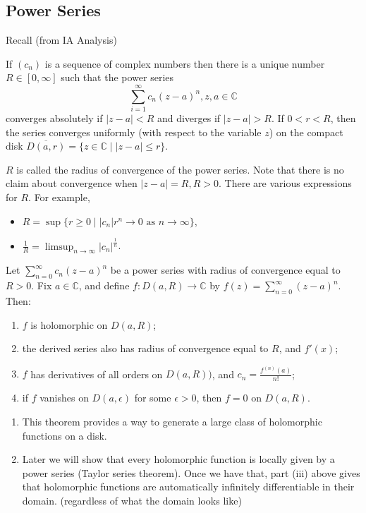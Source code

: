 \subsection{Power Series}
Recall (from IA Analysis)
\begin{theorem}
    If \((c_n)\) is a sequence of complex numbers then there is a unique number \(R \in [0, \infty]\) such that the power series
    \[
        \sum\limits_{i=1}^{\infty} c_n(z-a)^n, z,a\in\mathbb{C}
    \]
    converges absolutely if \(\left\vert z - a \right\vert <R\) and diverges if \(\left\vert z - a \right\vert > R\). If \(0<r<R\), then the series converges uniformly (with respect to the variable \(z\)) on the compact disk \(\overline{D(a, r)} = \{z\in\mathbb{C}\mid \left\vert z - a \right\vert \leq r\}\).
\end{theorem}
\(R\) is called the radius of convergence of the power series. Note that there is no claim about convergence when \(\left\vert z - a \right\vert = R, R>0\). There are various expressions for \(R\). For example,
\begin{itemize}
    \item \(R = \sup \{r \geq  0 \mid \left\vert c_n \right\vert r^n \to 0 \text{ as } n \to \infty\}\),
    \item \(\frac{1}{R} = \limsup_{n\to \infty}\left\vert c_n \right\vert^{\frac{1}{n}}\).
\end{itemize}
\begin{theorem}
    Let \(\sum\limits_{n=0}^{\infty} c_n(z-a)^n\) be a power series with radius of convergence equal to \(R > 0\). Fix \(a \in \mathbb{C}\), and define \(f: D(a, R) \to \mathbb{C}\) by \(f(z) = \sum\limits_{n=0}^{\infty} (z-a)^n\). Then:
    \begin{enumerate}
        \item \(f\) is holomorphic on \(D(a,R)\);
        \item the derived series also has radius of convergence equal to \(R\), and \(f'(x)\); 
        \item \(f\) has derivatives of all orders on \(D(a,R))\), and \(c_n = \frac{f^{(n)}(a)}{n!}\);
        \item if \(f\) vanishes on \(D(a,\epsilon)\) for some \(\epsilon >0\), then \(f = 0\) on \(D(a,R)\).
    \end{enumerate}
\end{theorem}
\begin{remark}
    \begin{enumerate}
    \item This theorem provides a way to generate a large class of holomorphic
    functions on a disk.
    \item Later we will show that every holomorphic function is locally given by a power series (Taylor series theorem). Once we have that, part (iii) above gives that holomorphic functions are automatically infinitely differentiable in their domain. (regardless of what the domain looks like)
    \end{enumerate}
\end{remark}
